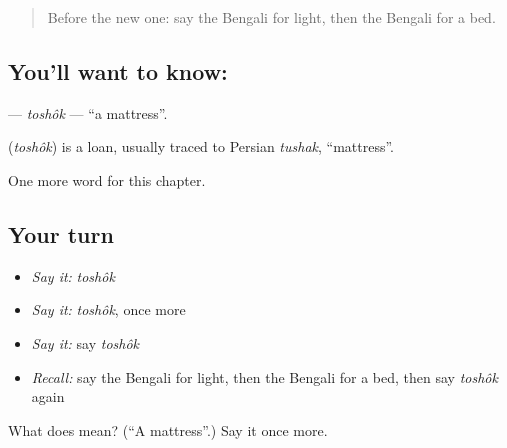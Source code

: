 \begin{quote}
Before the new one: say the Bengali for light, then the Bengali for a bed.
\end{quote}

\subsection*{You'll want to know: }
\textbf{} — \emph{toshôk} — \textquotedblleft{}a mattress\textquotedblright{}.

\begin{cousinweb}
\textbf{} (\emph{toshôk}) is a loan, usually traced to Persian \emph{tushak}, \textquotedblleft{}mattress\textquotedblright{}.
\end{cousinweb}

\begin{grammarlens}[title={What you've built}]
One more word for this chapter.
\end{grammarlens}

\subsection*{Your turn}
\begin{itemize}
\raggedright
  \item \emph{Say it:} \emph{toshôk}
  \item \emph{Say it:} \emph{toshôk}, once more
  \item \emph{Say it:} say \emph{toshôk}
  \item \emph{Recall:} say the Bengali for light, then the Bengali for a bed, then say \emph{toshôk} again
\end{itemize}

\begin{tcolorbox}[breakable,colback=teal!4,colframe=teal!35!black,title={Before you move on}]
What does  mean? (\textquotedblleft{}A mattress\textquotedblright{}.) Say it once more.
\end{tcolorbox}
